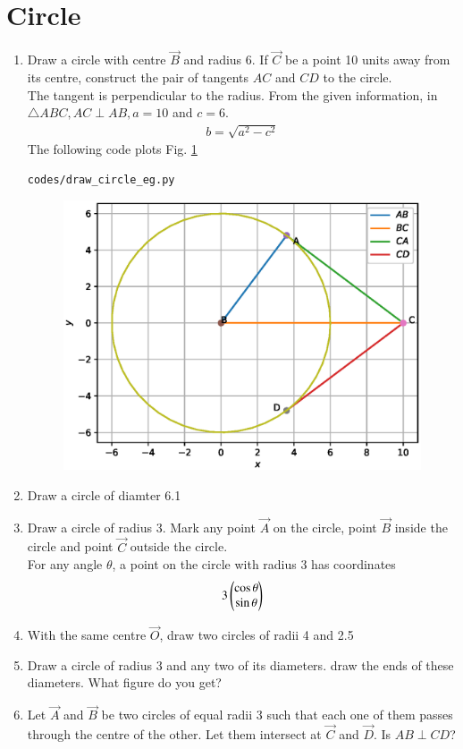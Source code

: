 \documentclass[journal,12pt,twocolumn]{IEEEtran}
\renewcommand\thesection{\arabic{section}}
\begin{document}
\section{Circle}
\begin{enumerate}[label=\thesection.\arabic*
,ref=\thesection.\theenumi]
\item Draw a circle with centre $\vec{B}$ and radius 6.  If $\vec{C}$ be  a point 10 units  away from its 
centre, construct the pair of tangents $AC$ and $CD$ to the 
circle.
\\
\solution The tangent is perpendicular to the radius.
%
From the given information, in $\triangle ABC, AC \perp AB, a = 
10$ and $c = 6$.
\begin{align}
b =  \sqrt{a^2-c^2}
\end{align}
The following code plots Fig. \ref{fig:circle}
\begin{lstlisting}
codes/draw_circle_eg.py
\end{lstlisting}
\begin{figure}[!ht]
\includegraphics[width=\columnwidth]{./figs/circle.eps}
\caption{}
\label{fig:circle}
\end{figure}
\item Draw a circle of diamter 6.1

\item Draw a circle of radius 3.  Mark any point $\vec{A}$ on the circle, point  $\vec{B}$ inside the circle  and point  $\vec{C}$ outside the circle.
\\
For any angle $\theta$, a point on the circle with radius 3 has coordinates
\begin{align}
3\begin{pmatrix}\cos \theta\\ \sin\theta\end{pmatrix}
\end{align}
\item With the same centre $\vec{O}$,  draw two circles of radii 4 and 2.5
\item Draw a circle of radius 3 and any two of its diameters.  draw the ends of these diameters. What figure do you get?
\item Let $\vec{A}$ and $\vec{B}$ be two circles of equal radii 3 such that each one of them passes through the centre of the other.  Let them intersect at $\vec{C}$ and $\vec{D}$.  Is $AB \perp CD$?


\end{enumerate}
\end{document}
